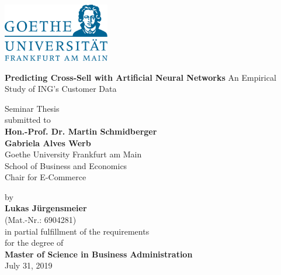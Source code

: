 \documentclass[12pt,a4paper]{article}
\begin{document}
\begin{center}
 \includegraphics[width=0.35\textwidth]{GU-Logo-blau-CMYK.eps} \vspace{2cm}
  
  {\Large{\bf Predicting Cross-Sell with Artificial Neural Networks}} \newline
  {\Large{An Empirical Study of ING's Customer Data}} \vspace{0.5cm}

  Seminar Thesis \\\vspace{2cm}
  submitted to \\\vspace{0.5cm}
  \textbf{Hon.-Prof. Dr. Martin Schmidberger} \\
  \textbf{Gabriela Alves Werb} \\\vspace{0.5cm}
  Goethe University Frankfurt am Main \\
  School of Business and Economics \\
  Chair for E-Commerce \vspace{2cm}
  
  by \\\vspace{0.5cm}
  \textbf{Lukas J\"urgensmeier} \\
  (Mat.-Nr.: 6904281) \\
  
  \medskip
  \medskip
  in partial fulfillment of the requirements \\
  for the degree of \\\vspace{0.5cm}
  \textbf{Master of Science in Business Administration} \\\vspace{0.5cm}
  July 31, 2019
  
\end{center}


\pagebreak
\pagestyle{plain}
\tableofcontents
\listoffigures
\listoftables
\newpage
\setcounter{page}{2}
\setlength{\baselineskip}{1.5\baselineskip}
\pagestyle{plain}
\end{document}
